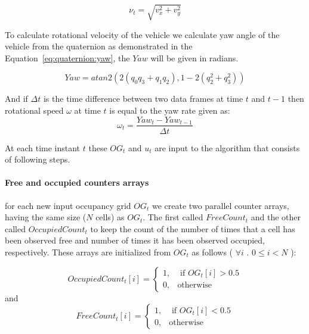 \begin{equation}
\label{eq:ch03:velocities}
\nu_t = \sqrt{v_x^2+v_y^2}
\end{equation}

To calculate rotational velocity of the vehicle we calculate yaw angle of the vehicle from the quaternion
as demonstrated in the Equation~\ref{eq:quaternion:yaw}, the $Yaw$ will be given in radians.

\begin{equation}
Yaw = atan2(2(q_0 q_3+q_1 q_2),1-2(q_2^2+q_3^2))
\label{eq:quaternion:yaw}
\end{equation}

And if $\Delta t$ is the time difference between two data frames at time $t$ and $t-1$ then rotational speed $\omega$
at time $t$ is equal to the yaw rate given as:
\begin{equation}
\omega_t = \frac{Yaw_t-Yaw_{t-1}}{\Delta t}
\end{equation}

At each time instant $t$ these $OG_t$ and $u_t$ are input to the algorithm that consists of 
following steps.

\paragraph{Free and occupied counters arrays} for each new input occupancy grid $OG_t$ we 
create two parallel counter arrays, having the same size ($N$ cells) as $OG_t$. The first called $FreeCount_t$ and the other called $OccupiedCount_t$ to keep the count of the number of times that a cell has been observed free and number of times it has been observed occupied, respectively. These arrays are initialized from $OG_t$ as follows ( $\forall i$  . $0 \leq i<N$ ):

\begin{equation}
OccupiedCount_t[i] =  \begin{cases} 1, & \mbox{ if $OG_t[i] > 0.5$} \\
                       0, & \mbox{otherwise} \end{cases}
\end{equation}
and
\begin{equation}
FreeCount_t[i] = \begin{cases} 1, & \mbox{ if $OG_t[i] < 0.5$} \\
                       0, & \mbox{otherwise} \end{cases}
\end{equation}

